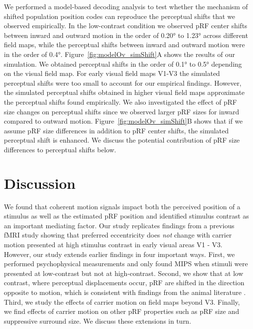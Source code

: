 We performed a model-based decoding analysis to test whether the mechanism of shifted population position codes can reproduce the perceptual shifts that we observed empirically. In the low-contrast condition we observed pRF center shifts between inward and outward motion in the order of 0.20° to 1.23° across different field maps, while the perceptual shifts between inward and outward motion were in the order of 0.4°. Figure~\ref{fig:modelOv_simShift}A shows the results of our simulation. We obtained perceptual shifts in the order of 0.1° to 0.5° depending on the visual field map. For early visual field maps V1-V3 the simulated perceptual shifts were too small to account for our empirical findings. However, the simulated perceptual shifts obtained in higher visual field maps approximate the perceptual shifts found empirically. We also investigated the effect of pRF size changes on perceptual shifts since we observed larger pRF sizes for inward compared to outward motion. Figure~\ref{fig:modelOv_simShift}B shows that if we assume pRF size differences in addition to pRF center shifts, the simulated perceptual shift is enhanced. We discuss the potential contribution of pRF size differences to perceptual shifts below.

\section{Discussion}
We found that coherent motion signals impact both the perceived position of a stimulus as well as the estimated pRF position and identified stimulus contrast as an important mediating factor. Our study replicates findings from a previous fMRI study showing that preferred eccentricity does \textit{not} change with carrier motion presented at high stimulus contrast in early visual areas V1 - V3. However, our study extends earlier findings in four important ways. First, we performed psychophysical measurements and only found MIPS when stimuli were presented at low-contrast but not at high-contrast. Second, we show that at low contrast, where perceptual displacements occur, pRF are shifted in the direction opposite to motion, which is consistent with findings from the animal literature \parencite{Fu2004}. Third, we study the effects of carrier motion on field maps beyond V3. Finally, we find effects of carrier motion on other pRF properties such as pRF size and suppressive surround size. We discuss these extensions in turn.

